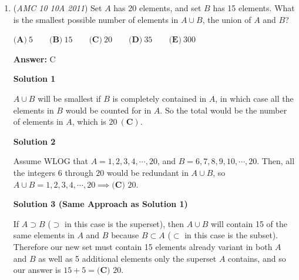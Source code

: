 \begin{enumerate}
Let us say that there are $f$ fifth graders. According to the given information, there must be $2f$ fourth graders and $4f$ third graders. The average time run by each student is equal to the total amount of time run divided by the number of students. This gives us $\frac{12\cdot 4f + 15\cdot 2f + 10\cdot f}{4f + 2f + f} = \frac{88f}{7f} = \frac{88}{7} \Rightarrow \boxed{C}$

 


 If you want to simplify the problem even more, just imagine/assume that only $1$ fifth grader existed. Then you can simply get rid of the variables.

 


 


	\item (\textit{AMC 10 10A 2011}) Set $A$ has 20 elements, and set $B$ has 15 elements. What is the smallest possible number of elements in $A   \cup  B$, the union of $A$ and $B$?


 $\textbf{(A)}\ 5 \qquad\textbf{(B)}\ 15 \qquad\textbf{(C)}\ 20\qquad\textbf{(D)}\ 35\qquad\textbf{(E)}\ 300$

 \textbf{Answer: }C



\textbf{Solution 1}

$A \cup B$ will be smallest if $B$ is completely contained in $A$, in which case all the elements in $B$ would be counted for in $A$. So the total would be the number of elements in $A$, which is $\boxed{20 \ \mathbf{(C)}}$.

 



\textbf{Solution 2}

Assume WLOG that $A={1, 2, 3, 4, \cdots , 20}$, and $B={6, 7, 8, 9, 10, \cdots , 20}$. Then, all the integers $6$ through $20$ would be redundant in $A \cup B$, so $A \cup B = 1, 2, 3, 4, \cdots, 20 \implies \boxed{\textbf{(C) }20}$.

 



\textbf{Solution 3 (Same Approach as Solution 1)}

If $A \supset B$ ($\supset$ in this case is the superset), then $A \cup B$ will contain 15 of the same elements in $A$ and $B$ because $B \subset A$ ($\subset$ in this case is the subset). Therefore our new set must contain 15 elements already variant in both $A$ and $B$ as well as 5 additional elements only the superset $A$ contains, and so our answer is $15+5= \boxed{\textbf{(C) }20}$.


\end{enumerate}

